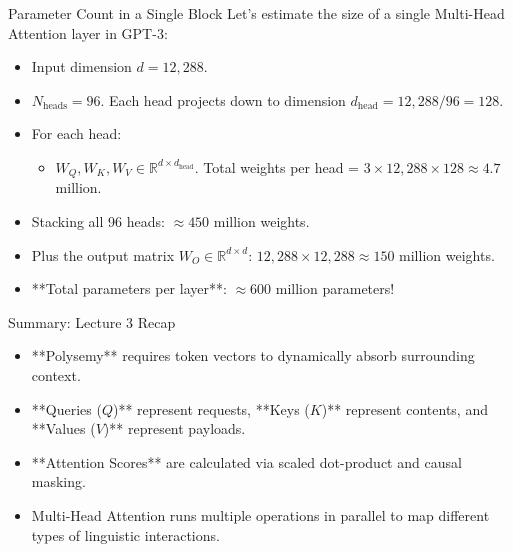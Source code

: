 \documentclass[aspectratio=169]{beamer}
\begin{document}
\begin{frame}{Parameter Count in a Single Block}
  Let's estimate the size of a single Multi-Head Attention layer in GPT-3:
  \begin{itemize}
    \item Input dimension $d = 12,288$.
    \item $N_{\text{heads}} = 96$. Each head projects down to dimension $d_{\text{head}} = 12,288 / 96 = 128$.
    \item For each head:
      \begin{itemize}
        \item $W_Q, W_K, W_V \in \mathbb{R}^{d \times d_{\text{head}}}$. Total weights per head = $3 \times 12,288 \times 128 \approx 4.7$ million.
      \end{itemize}
    \item Stacking all 96 heads: $\approx 450$ million weights.
    \item Plus the output matrix $W_O \in \mathbb{R}^{d \times d}$: $12,288 \times 12,288 \approx 150$ million weights.
    \item **Total parameters per layer**: $\approx 600$ million parameters!
  \end{itemize}
\end{frame}

\begin{frame}{Summary: Lecture 3 Recap}
  \begin{itemize}
    \item **Polysemy** requires token vectors to dynamically absorb surrounding context.
    \item **Queries ($Q$)** represent requests, **Keys ($K$)** represent contents, and **Values ($V$)** represent payloads.
    \item **Attention Scores** are calculated via scaled dot-product and causal masking.
    \item Multi-Head Attention runs multiple operations in parallel to map different types of linguistic interactions.
  \end{itemize}
\end{frame}
\end{document}
